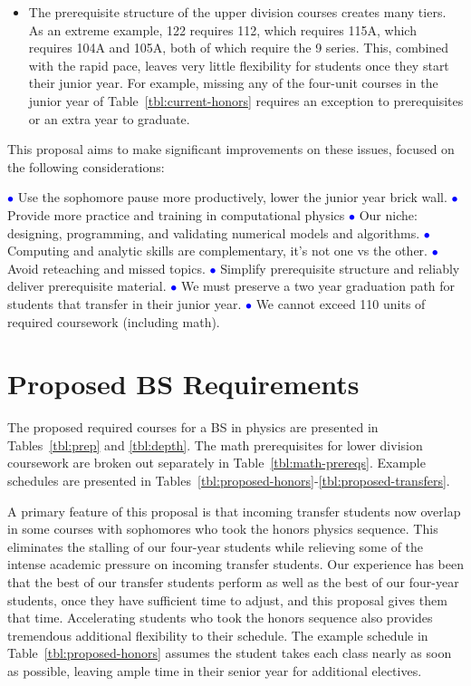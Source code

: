 \documentclass[12pt]{article}
\newcommand{\tcb}{\textcolor{blue}}
\begin{document}
\begin{itemize}
\item The prerequisite structure of the upper division courses creates
  many tiers.  As an extreme example, 122 requires 112, which requires
  115A, which requires 104A and 105A, both of which require the 9
  series.  This, combined with the rapid pace, leaves very little
  flexibility for students once they start their junior year.  For
  example, missing any of the four-unit courses in the junior year of
  Table~\ref{tbl:current-honors} requires an exception to
  prerequisites or an extra year to graduate.
\end{itemize}

This proposal aims to make significant improvements on these
issues, focused on the following considerations:

\vskip0.10in \noindent \tcb{$\bullet$}
Use the sophomore pause more productively, lower the junior year brick wall.
\vskip0.04in \noindent \tcb{$\bullet$}
Provide more practice and training in computational physics
\vskip0.04in \noindent \tcb{$\bullet$}
Our niche: designing, programming, and validating numerical models and algorithms.
\vskip0.04in \noindent \tcb{$\bullet$}
Computing and analytic skills are complementary, it's not one vs the other.
\vskip0.04in \noindent \tcb{$\bullet$}
Avoid reteaching and missed topics.
\vskip0.04in \noindent \tcb{$\bullet$}
Simplify prerequisite structure and reliably deliver prerequisite material.
\vskip0.04in \noindent \tcb{$\bullet$}
We must preserve a two year graduation path for students that transfer in their junior year.
\vskip0.04in \noindent \tcb{$\bullet$}
We cannot exceed 110 units of required coursework (including math).


\newpage


\section{Proposed BS Requirements}

The proposed required courses for a BS in physics are presented in
Tables~\ref{tbl:prep} and \ref{tbl:depth}.  The math prerequisites for
lower division coursework are broken out separately in
Table~\ref{tbl:math-prereqs}.  Example schedules are presented in
Tables~\ref{tbl:proposed-honors}-\ref{tbl:proposed-transfers}.

A primary feature of this proposal is that incoming transfer students
now overlap in some courses with sophomores who took the honors
physics sequence.  This eliminates the stalling of our four-year
students while relieving some of the intense academic pressure on
incoming transfer students.  Our experience has been that the best of
our transfer students perform as well as the best of our four-year
students, once they have sufficient time to adjust, and this proposal
gives them that time.  Accelerating students who took the honors
sequence also provides tremendous additional flexibility to their
schedule.  The example schedule in Table~\ref{tbl:proposed-honors}
assumes the student takes each class nearly as soon as possible,
leaving ample time in their senior year for additional electives.
\end{document}
